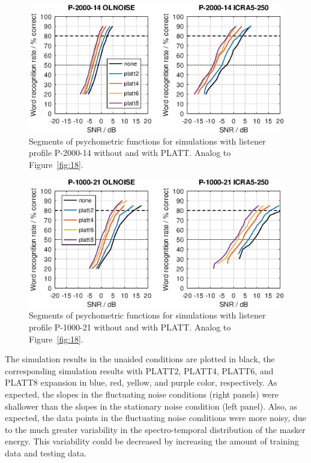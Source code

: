\documentclass[10pt,a4paper,twocolumn]{article}
\begin{document}
\begin{figure}
	\centerline{\includegraphics[width=\columnwidth]{images/psyfun-P-2000-14}}
	\caption{Segments of psychometric functions for simulations with listener profile P-2000-14 without and with PLATT. Analog to Figure~\ref{fig:18}.}
	\label{fig:19}
\end{figure}
%
\begin{figure}
	\centerline{\includegraphics[width=\columnwidth]{images/psyfun-P-1000-21}}
	\caption{Segments of psychometric functions for simulations with listener profile P-1000-21 without and with PLATT. Analog to Figure~\ref{fig:18}.}
	\label{fig:20}
\end{figure}
%
The simulation results in the unaided conditions are plotted in black, the corresponding simulation results with PLATT2, PLATT4, PLATT6, and PLATT8 expansion in blue, red, yellow, and purple color, respectively.
%
As expected, the slopes in the fluctuating noise conditions (right panels) were shallower than the slopes in the stationary noise condition (left panel).
%
Also, as expected, the data points in the fluctuating noise conditions were more noisy, due to the much greater variability in the spectro-temporal distribution of the masker energy.
%
This variability could be decreased by increasing the amount of training data and testing data.
\end{document}
